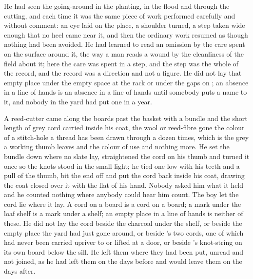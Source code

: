 He had seen the going-around in the planting, in the flood and through the cutting, and each time it was the same piece of work performed carefully and without comment: an eye laid on the place, a shoulder turned, a step taken wide enough that no heel came near it, and then the ordinary work resumed as though nothing had been avoided. He had learned to read an omission by the care spent on the surface around it, the way a man reads a wound by the cleanliness of the field about it; here the care was spent in a step, and the step was the whole of the record, and the record was a direction and not a figure. He did not lay that empty place under the empty space at the rack or under the gaps on ; an absence in a line of hands is an absence in a line of hands until somebody puts a name to it, and nobody in the yard had put one in a year.

\scenebreak

A reed-cutter came along the boards past the basket with a bundle and the short length of grey cord carried inside his coat, the wool or reed-fibre gone the colour of a stitch-hole a thread has been drawn through a dozen times, which is the grey a working thumb leaves and the colour of use and nothing more. He set the bundle down where no slate lay, straightened the cord on his thumb and turned it once so the knots stood in the small light; he tied one low with his teeth and a pull of the thumb, bit the end off and put the cord back inside his coat, drawing the coat closed over it with the flat of his hand. Nobody asked him what it held and he counted nothing where anybody could hear him count. The boy let the cord lie where it lay. A cord on a board is a cord on a board; a mark under the loaf shelf is a mark under a shelf; an empty place in a line of hands is neither of these. He did not lay the cord beside the charcoal under the shelf, or beside the empty place the yard had just gone around, or beside 's two cords, one of which had never been carried upriver to  or lifted at a door, or beside 's knot-string on its own board below the sill. He left them where they had been put, unread and not joined, as he had left them on the days before and would leave them on the days after.

